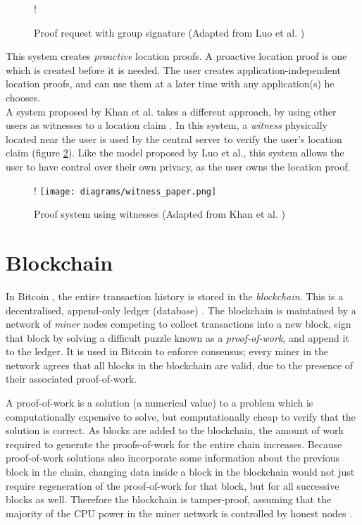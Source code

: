 \begin{figure}[H]
\begin{center}
 {!} {}
\caption{Proof request with group signature (Adapted from Luo et al. \cite{luo})}
\label{fig:luo_transaction}
\end{center}
\end{figure}

This system creates \textit{proactive} location proofs. A proactive location proof is one which is created before it is needed. The user creates application-independent location proofs, and can use them at a later time with any application(s) he chooses.
\\

A system proposed by Khan et al. takes a different approach, by using other users as witnesses to a location claim \cite{khan}. In this system, a \textit{witness} physically located near the user is used by the central server to verify the user's location claim (figure \ref{fig:witness_paper}). Like the model proposed by Luo et al., this system allows the user to have control over their own privacy, as the user owns the location proof.

\begin{figure}[H]
\begin{center}
 {!} {\texttt{[image: diagrams/witness\_paper.png]}}
\caption{Proof system using witnesses (Adapted from Khan et al. \cite{khan})}
\label{fig:witness_paper}
\end{center}
\end{figure}

\section{Blockchain}
In Bitcoin \cite{bitcoin}, the entire transaction history is stored in the \textit{blockchain}. This is a decentralised, append-only ledger (database) \cite{blueprint}. The blockchain is maintained by a network of \textit{miner} nodes competing to collect transactions into a new block, sign that block by solving a difficult puzzle known as a \textit{proof-of-work}, and append it to the ledger. It is used in Bitcoin to enforce consensus; every miner in the network agrees that all blocks in the blockchain are valid, due to the presence of their associated proof-of-work.

A proof-of-work is a solution (a numerical value) to a problem which is computationally expensive to solve, but computationally cheap to verify that the solution is correct. As blocks are added to the blockchain, the amount of work required to generate the proofs-of-work for the entire chain increases. Because proof-of-work solutions also incorporate some information about the previous block in the chain, changing data inside a block in the blockchain would not just require regeneration of the proof-of-work for that block, but for all successive blocks as well. Therefore the blockchain is tamper-proof, assuming that the majority of the CPU power in the miner network is controlled by  honest nodes \cite{bitcoin}.

